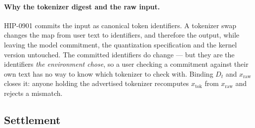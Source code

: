 \documentclass[11pt,a4paper]{article}
\begin{document}
\paragraph{Why the tokenizer digest and the raw input.} HIP-0901 commits the input
as canonical token identifiers. A tokenizer swap changes the map from user text to
identifiers, and therefore the output, while leaving the model commitment, the
quantization specification and the kernel version untouched. The committed
identifiers do change --- but they are the identifiers \emph{the environment chose},
so a user checking a commitment against their own text has no way to know which
tokenizer to check with. Binding $D_t$ and $x_{\text{raw}}$ closes it: anyone
holding the advertised tokenizer recomputes $x_{\text{tok}}$ from $x_{\text{raw}}$
and rejects a mismatch.

\subsection{Settlement}
\end{document}
